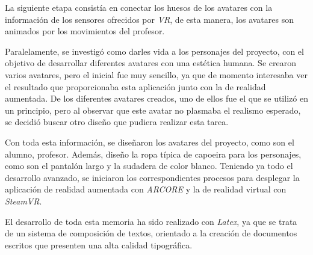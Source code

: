 La siguiente etapa consistía en conectar los huesos de los avatares con la información de los sensores ofrecidos por \textit{VR}, de esta manera, los avatares son animados por los movimientos del profesor. 

Paralelamente, se investigó como darles vida a los personajes del proyecto, con el objetivo de desarrollar diferentes avatares con una estética humana. Se crearon varios avatares, pero el inicial fue muy sencillo, ya que de momento interesaba ver el resultado que proporcionaba esta aplicación junto con la de realidad aumentada. De los diferentes avatares creados, uno de ellos fue el que se utilizó en un principio, pero al observar que este avatar no plasmaba el realismo esperado, se decidió buscar otro diseño que pudiera realizar esta tarea. 

Con toda esta información, se diseñaron los avatares del proyecto, como son el alumno, profesor. Además, diseño la ropa típica de capoeira para los personajes, como son el pantalón largo y la sudadera de color blanco. Teniendo ya todo el desarrollo avanzado, se iniciaron los correspondientes procesos para desplegar la aplicación de realidad aumentada con \textit{ARCORE} y la de realidad virtual con \textit{SteamVR}.

El desarrollo de toda esta memoria ha sido realizado con \textit{Latex}, ya que se trata de un sistema de composición de textos, orientado a la creación de documentos escritos que presenten una alta calidad tipográfica.
